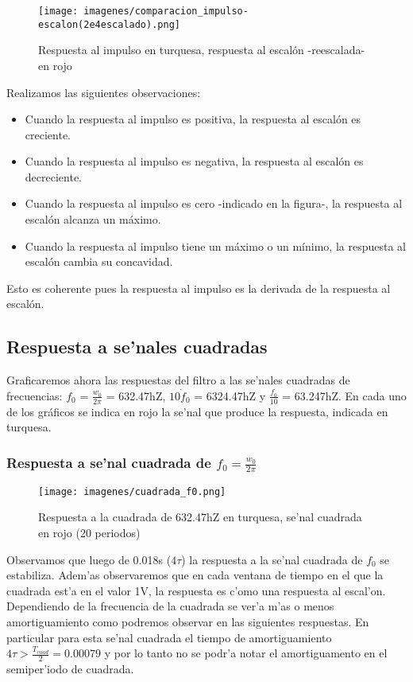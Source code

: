 \documentclass[12pt, titlepage]{article}
\begin{document}
     \begin{figure}[!htb]
     \texttt{[image: imagenes/comparacion\_impulso-escalon(2e4escalado).png]}
     \centering
     \caption{Respuesta al impulso en turquesa, respuesta al escalón -reescalada- en rojo}
    \end{figure}
    
    Realizamos las siguientes observaciones:
    
    \begin{itemize}
        \item Cuando la respuesta al impulso es positiva, la respuesta al escalón es creciente.
        \item Cuando la respuesta al impulso es negativa, la respuesta al escalón es decreciente.
        \item Cuando la respuesta al impulso es cero -indicado en la figura-, la respuesta al escalón alcanza un máximo.
        \item Cuando la respuesta al impulso tiene un máximo o un mínimo, la respuesta al escalón cambia su concavidad.
    \end{itemize}
    
    
    Esto es coherente pues la respuesta al impulso es la derivada de la respuesta al escalón.

    \subsection{Respuesta a se'nales cuadradas}
    Graficaremos ahora las respuestas del filtro a las se'nales cuadradas de frecuencias: $f_0$ = $\frac{w_0}{2\pi}$ = 632.47hZ, $10 \dot f_0$ = 6324.47hZ y $\frac{f_0}{10}$ = 63.247hZ. En cada uno de los gráficos se indica en rojo la se'nal que produce la respuesta, indicada en turquesa.

    \newpage
    
    \subsubsection{Respuesta a se'nal cuadrada de $f_0 = \frac{w_0}{2\pi}$ }
      \begin{figure}[!htb]
     \texttt{[image: imagenes/cuadrada\_f0.png]}
     \centering
     \caption{Respuesta a la cuadrada de 632.47hZ en turquesa, se'nal cuadrada en rojo (20 periodos)}
    \end{figure}
    
    \begin{small}
     Observamos que luego de 0.018s ($4\tau$) la respuesta a la se'nal cuadrada de $f_0$ se estabiliza. Adem'as observaremos que en cada ventana de tiempo en el que la cuadrada est'a en el valor 1V, la respuesta es c'omo una respuesta al escal'on. Dependiendo de la frecuencia de la cuadrada se ver'a m'as o menos amortiguamiento como podremos observar en las siguientes respuestas. En particular para esta se'nal cuadrada el tiempo de amortiguamiento $4\tau > \frac{T_{cuad}}{2} = 0.00079$ y por lo tanto no se podr'a notar el amortiguamento en el semiper'iodo de cuadrada.
    \end{small}
   
\end{document}
